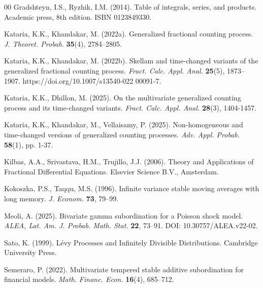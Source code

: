 \documentclass[12pt,oneside,reqno]{amsart}
\numberwithin{equation}{section}
\theoremstyle{definition}
\numberwithin{equation}{section}
\theoremstyle{remarkstyle}
\begin{document}
\begin{thebibliography}{00}
Gradshteyn, I.S., Ryzhik, I.M. (2014). Table of integrals, series, and products. Academic press, 8th edition. ISBN 0123849330.	

Kataria, K.K., Khandakar, M. (2022a). Generalized fractional counting process. {\it J. Theoret. Probab.} {\bf 35}(4),
2784–2805.

Kataria, K.K., Khandakar, M. (2022b). Skellam and time-changed variants of the generalized fractional counting process. {\it Fract. Calc. Appl. Anal.} {\bf 25}(5), 1873–1907. https://doi.org/10.1007/s13540-022
00091-7.


	
Kataria, K.K., Dhillon, M. (2025). On the multivariate generalized counting process and its
time-changed variants. {\it Fract. Calc. Appl. Anal.} {\bf 28}(3), 1404-1457.

Kataria, K.K., Khandakar, M., Vellaisamy, P. (2025). Non-homogeneous and time-changed versions of generalized counting processes. {\it Adv. Appl. Probab.} {\bf 58}(1), pp. 1-37.

Kilbas, A.A., Srivastava, H.M., Trujillo, J.J. (2006). Theory and Applications of Fractional Differential Equations. Elsevier Science B.V., Amsterdam.

Kokoszka, P.S., Taqqu, M.S. (1996). Infinite variance stable moving averages with long memory. {\it J. Econom.} {\bf 73}, 79–99.


		
Meoli, A. (2025). Bivariate gamma subordination for a Poisson shock model. {\it ALEA, Lat. Am. J. Probab. Math. Stat.} {\bf22}, 73–91. DOI: 10.30757/ALEA.v22-02.
 
 Sato, K. (1999). L\'evy Processes and Infinitely Divisible Distributions. Cambridge University Press.
 
Semeraro, P. (2022). Multivariate tempered stable additive subordination for financial models. {\it Math. Financ. Econ.} {\bf 16}(4), 685–712.
  
 
 
 
 \end{thebibliography}
\end{document}
